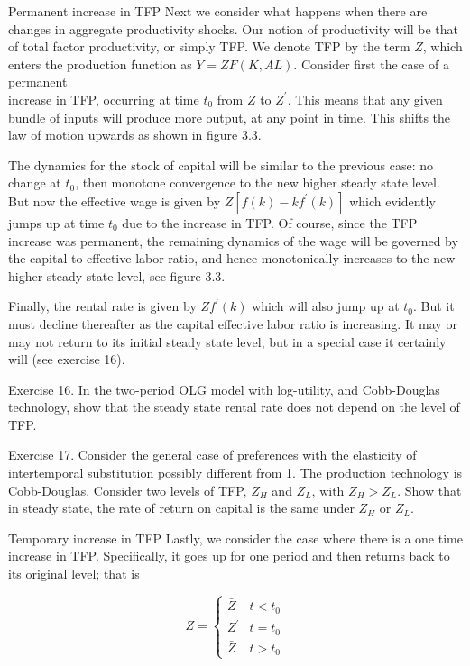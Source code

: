 \documentclass[10pt]{article}
\begin{document}
Permanent increase in TFP Next we consider what happens when there are changes in aggregate productivity shocks. Our notion of productivity will be that of total factor productivity, or simply TFP. We denote TFP by the term $Z$, which enters the production function as $Y=Z F(K, A L)$. Consider first the case of a permanent\\
increase in TFP, occurring at time $t_{0}$ from $Z$ to $Z^{\prime}$. This means that any given bundle of inputs will produce more output, at any point in time. This shifts the law of motion upwards as shown in figure 3.3.

The dynamics for the stock of capital will be similar to the previous case: no change at $t_{0}$, then monotone convergence to the new higher steady state level. But now the effective wage is given by $Z\left[f(k)-k f^{\prime}(k)\right]$ which evidently jumps up at time $t_{0}$ due to the increase in TFP. Of course, since the TFP increase was permanent, the remaining dynamics of the wage will be governed by the capital to effective labor ratio, and hence monotonically increases to the new higher steady state level, see figure 3.3.

Finally, the rental rate is given by $Z f^{\prime}(k)$ which will also jump up at $t_{0}$. But it must decline thereafter as the capital effective labor ratio is increasing. It may or may not return to its initial steady state level, but in a special case it certainly will (see exercise 16).

Exercise 16. In the two-period OLG model with log-utility, and Cobb-Douglas technology, show that the steady state rental rate does not depend on the level of TFP.

Exercise 17. Consider the general case of preferences with the elasticity of intertemporal substitution possibly different from 1. The production technology is Cobb-Douglas. Consider two levels of TFP, $Z_{H}$ and $Z_{L}$, with $Z_{H}>Z_{L}$. Show that in steady state, the rate of return on capital is the same under $Z_{H}$ or $Z_{L}$.

Temporary increase in TFP Lastly, we consider the case where there is a one time increase in TFP. Specifically, it goes up for one period and then returns back to its original level; that is

$$
Z= \begin{cases}\bar{Z} & t<t_{0} \\ Z^{\prime} & t=t_{0} \\ \bar{Z} & t>t_{0}\end{cases}
$$
\end{document}
